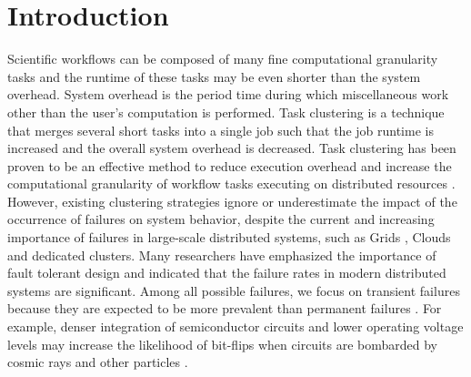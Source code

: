 \documentclass{IOS-Book-Article}
\begin{document}
\thispagestyle{empty}
\pagestyle{empty}

\section*{Introduction}


Scientific workflows can be composed of many fine computational granularity tasks and the runtime of these tasks may be even shorter than the system overhead. System overhead is the period time during which miscellaneous work other than the user’s computation is performed. Task clustering \cite{Chen2013a, Singh2008, Chen2012, Maheshwari2012, Ferreira-granularity-2013, Integration2012} is a technique that merges several short tasks into a single job such that the job runtime is increased and the overall system overhead is decreased. 
Task clustering has been proven to be an effective method to reduce execution overhead and increase the computational granularity of workflow tasks executing on distributed resources \cite{Ying2009, Singh2008, Chen2013a, Chen2012, Ferreira-granularity-2013}.
However, existing clustering strategies ignore or underestimate the impact of the occurrence of failures on system behavior, despite the current and increasing importance of failures in large-scale distributed systems, such as Grids \cite{Bresnahan2011, Deelman2004, Rubing2005}, Clouds \cite{Deelman2008, Berriman2010, Bresnahan2011} and dedicated clusters. Many researchers \cite{Zhang2004, Tang1990, Schroeder2006, Sahoo2004} have emphasized the importance of fault tolerant design and indicated that the failure rates in modern distributed systems are significant. Among all possible failures, we focus on transient failures because they are expected to be more prevalent than permanent failures \cite{Zhang2004}. For example, denser integration of semiconductor circuits and lower operating voltage levels may increase the likelihood of bit-flips when circuits are bombarded by cosmic rays and other particles \cite{Zhang2004}. 
\end{document}

